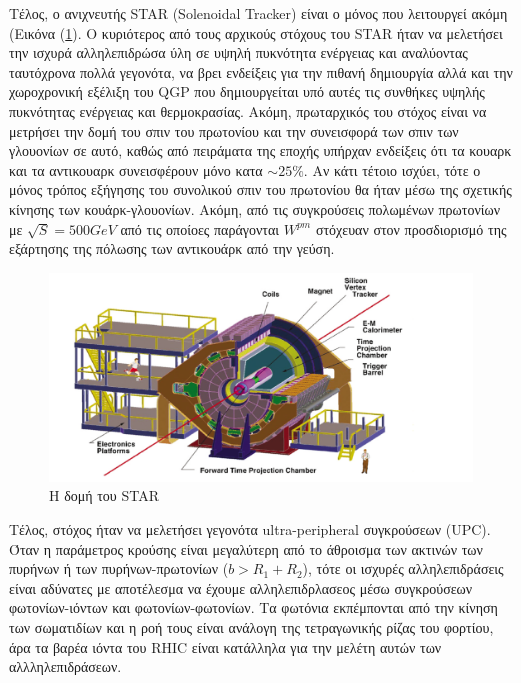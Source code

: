 	Τέλος, ο ανιχνευτής STAR (Solenoidal Tracker) είναι ο μόνος που λειτουργεί ακόμη (Εικόνα (\ref{im3.1}). Ο κυριότερος από τους αρχικούς στόχους του STAR %
	ήταν να μελετήσει την ισχυρά αλληλεπιδρώσα ύλη σε υψηλή πυκνότητα ενέργειας και αναλύοντας ταυτόχρονα πολλά γεγονότα, να βρει ενδείξεις για την πιθανή δημιουργία αλλά και την χωροχρονική εξέλιξη του QGP που δημιουργείται υπό αυτές τις συνθήκες υψηλής πυκνότητας ενέργειας και θερμοκρασίας. 
	Ακόμη, πρωταρχικός του στόχος είναι να μετρήσει την δομή του σπιν του πρωτονίου και την συνεισφορά των σπιν των γλουονίων σε αυτό, καθώς από πειράματα της εποχής υπήρχαν ενδείξεις ότι τα κουαρκ και τα αντικουαρκ συνεισφέρουν μόνο κατα $\sim25\%$. Αν κάτι τέτοιο ισχύει, τότε ο μόνος τρόπος εξήγησης του συνολικού σπιν του πρωτονίου θα ήταν μέσω της σχετικής κίνησης των κουάρκ-γλουονίων. Ακόμη, από τις συγκρούσεις πολωμένων πρωτονίων με $\sqrt{S}=500GeV$ από τις οποίοες παράγονται $W^{pm}$ στόχευαν στον προσδιορισμό της εξάρτησης της πόλωσης των αντικουάρκ από την γεύση.
	\begin{figure}[h!]
		\centering
		\includegraphics[scale=0.5]{STAR_Detectors/Star_Layout.png}
		\caption{Η δομή του STAR}
		\label{im3.1}
	\end{figure}
	
	Τέλος, στόχος ήταν να μελετήσει γεγονότα ultra-peripheral συγκρούσεων (UPC). Όταν η παράμετρος κρούσης είναι μεγαλύτερη από το άθροισμα των ακτινών των πυρήνων ή των πυρήνων-πρωτονίων ($b>R_1+R_2$), τότε οι ισχυρές αλληλεπιδράσεις είναι αδύνατες με αποτέλεσμα να έχουμε αλληλεπιδρλασεος μέσω συγκρούσεων φωτονίων-ιόντων και φωτονίων-φωτονίων. Τα φωτόνια εκπέμπονται από την κίνηση των σωματιδίων και η ροή τους είναι ανάλογη της τετραγωνικής ρίζας του φορτίου, άρα τα βαρέα ιόντα του RHIC είναι κατάλληλα για την μελέτη αυτών των αλλληλεπιδράσεων. 	
	
